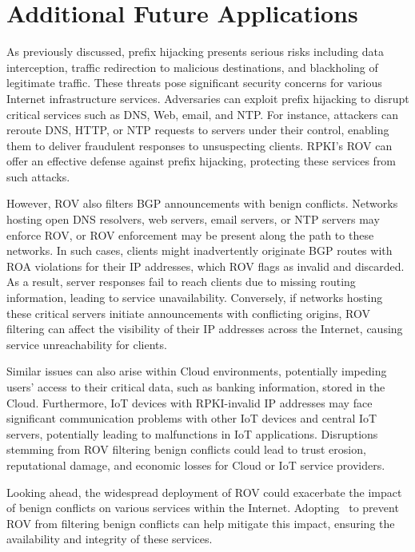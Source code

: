 \section{Additional Future Applications} \label{app:add_future_use}
As previously discussed, prefix hijacking presents serious risks including data interception, traffic redirection to malicious destinations, and blackholing of legitimate traffic. These threats pose significant security concerns for various Internet infrastructure services. Adversaries can exploit prefix hijacking to disrupt critical services such as DNS, Web, email, and NTP. For instance, attackers can reroute DNS, HTTP, or NTP requests to servers under their control, enabling them to deliver fraudulent responses to unsuspecting clients.
RPKI's ROV can offer an effective defense against prefix hijacking, protecting these services from such attacks.

However, ROV also filters BGP announcements with benign conflicts.
Networks hosting open DNS resolvers, web servers, email servers, or NTP servers may enforce ROV, or ROV enforcement may be present along the path to these networks. In such cases, clients might inadvertently originate BGP routes with ROA violations for their IP addresses, which ROV flags as invalid and discarded.
As a result, server responses fail to reach clients due to missing routing information, leading to service unavailability.
Conversely, if networks hosting these critical servers initiate announcements with conflicting origins, ROV filtering can affect the visibility of their IP addresses across the Internet, causing service unreachability for clients.

Similar issues can also arise within Cloud environments, potentially impeding users' access to their critical data, such as banking information, stored in the Cloud.
Furthermore, IoT devices with RPKI-invalid IP addresses may face significant communication problems with other IoT devices and central IoT servers, potentially leading to malfunctions in IoT applications.
Disruptions stemming from ROV filtering benign conflicts could lead to trust erosion, reputational damage, and economic losses for Cloud or IoT service providers.

Looking ahead, the widespread deployment of ROV could exacerbate the impact of benign conflicts on various services within the Internet. Adopting \lov\ to prevent ROV from filtering benign conflicts can help mitigate this impact, ensuring the availability and integrity of these services.